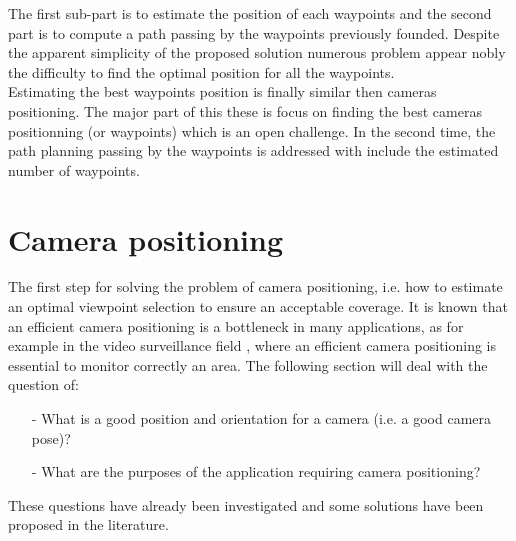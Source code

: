 The first sub-part is to estimate the position of each waypoints and the second part is to compute a path passing by the waypoints previously founded. Despite the apparent simplicity of the proposed solution numerous problem appear nobly the difficulty to find the optimal position for all the waypoints. \\
Estimating the best waypoints position is finally similar then cameras positioning. The major part of this these is focus on finding the best cameras positionning (or waypoints) which is an open challenge. In the second time, the path planning passing by the waypoints is addressed with include the estimated number of waypoints.





\section{Camera positioning }\label{sec:camerasPositioning}

The first step for solving the problem of camera positioning, i.e. how to estimate an optimal viewpoint selection to ensure an acceptable coverage. It is known that an efficient camera positioning is a bottleneck in many applications, as for example in the video surveillance field \cite{11*herrera2012,12*soto2009,18*ding2012,151*zhao2013,84*xu2011}, where an efficient camera positioning is essential to monitor correctly an area.  
The following section will deal with the question of: 
\begin{itemize}
\item[-]What is a good position and orientation for a camera (i.e. a good camera pose)?
\item[-]What are the purposes of the application requiring camera positioning?

\end{itemize}
These questions have already been investigated and some solutions have been proposed in the literature. 


